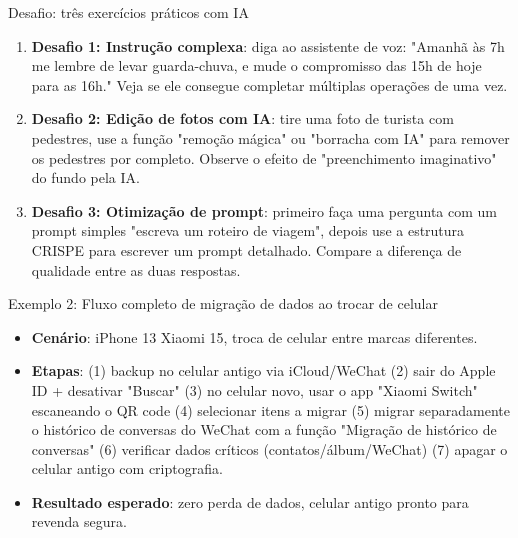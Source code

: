 \begin{tcbpractice}{Desafio: três exercícios práticos com IA}
\begin{enumerate}
  \item \textbf{Desafio 1: Instrução complexa}: diga ao assistente de voz: "Amanhã às 7h me lembre de levar guarda-chuva, e mude o compromisso das 15h de hoje para as 16h." Veja se ele consegue completar múltiplas operações de uma vez.
  \item \textbf{Desafio 2: Edição de fotos com IA}: tire uma foto de turista com pedestres, use a função "remoção mágica" ou "borracha com IA" para remover os pedestres por completo. Observe o efeito de "preenchimento imaginativo" do fundo pela IA.
  \item \textbf{Desafio 3: Otimização de prompt}: primeiro faça uma pergunta com um prompt simples "escreva um roteiro de viagem", depois use a estrutura CRISPE para escrever um prompt detalhado. Compare a diferença de qualidade entre as duas respostas.
\end{enumerate}

\end{tcbpractice}

\begin{tcbinfo}{Exemplo 2: Fluxo completo de migração de dados ao trocar de celular}
\begin{itemize}
  \item \textbf{Cenário}: iPhone 13 Xiaomi 15, troca de celular entre marcas diferentes.
  \item \textbf{Etapas}: (1) backup no celular antigo via iCloud/WeChat (2) sair do Apple ID + desativar "Buscar" (3) no celular novo, usar o app "Xiaomi Switch" escaneando o QR code (4) selecionar itens a migrar (5) migrar separadamente o histórico de conversas do WeChat com a função "Migração de histórico de conversas" (6) verificar dados críticos (contatos/álbum/WeChat) (7) apagar o celular antigo com criptografia.
  \item \textbf{Resultado esperado}: zero perda de dados, celular antigo pronto para revenda segura.
\end{itemize}

\end{tcbinfo}
